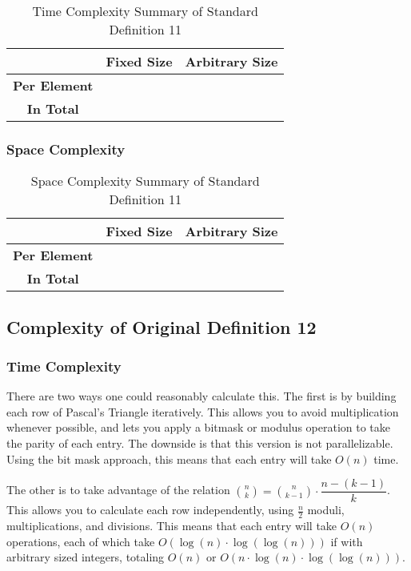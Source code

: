 \documentclass[conference]{IEEEtran}
\begin{document}
\begin{table}[H]
    \centering
    \caption{Time Complexity Summary of Standard Definition 11}
    \begin{tabular}{|c|c|c|}
        \hline
        & \textbf{Fixed Size} & \textbf{Arbitrary Size} \\
        \hline
        \textbf{Per Element} &  &  \\
        \hline
        \textbf{In Total} &  &  \\
        \hline
    \end{tabular}
    \label{tab:time_p2_d11}
\end{table}

\subsubsection{Space Complexity}

\begin{table}[H]
    \centering
    \caption{Space Complexity Summary of Standard Definition 11}
    \begin{tabular}{|c|c|c|}
        \hline
        & \textbf{Fixed Size} & \textbf{Arbitrary Size} \\
        \hline
        \textbf{Per Element} &  &  \\
        \hline
        \textbf{In Total} &  &  \\
        \hline
    \end{tabular}
    \label{tab:space_p2_d11}
\end{table}

\subsection{Complexity of Original Definition 12}
\label{ca:p2_d12}

\subsubsection{Time Complexity}

There are two ways one could reasonably calculate this. The first is by building each row of Pascal's Triangle iteratively. This allows you to avoid multiplication whenever possible, and lets you apply a bitmask or modulus operation to take the parity of each entry. The downside is that this version is not parallelizable. Using the bit mask approach, this means that each entry will take $O(n)$ time.

The other is to take advantage of the relation $\binom{n}{k} = \binom{n}{k-1} \cdot \dfrac{n - (k - 1)}{k}$. This allows you to calculate each row independently, using $\tfrac{n}{2}$ moduli, multiplications, and divisions. This means that each entry will take $O(n)$ operations, each of which take $O(\log(n) \cdot \log(\log(n)))$ if with arbitrary sized integers, totaling $O(n)$ or $O(n \cdot \log(n) \cdot \log(\log(n)))$.
\end{document}
